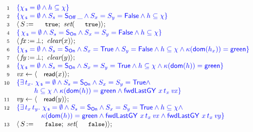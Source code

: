 \begin{figure}[t]
\[
\begin{array}[t]{r l}
  \num{1} & \specK{\{ \histS = \hempty \wedge h \subseteq \hist \}} \\
  \num{2} & \specK{\{ \histS = \hempty \wedge
                \sss = \sOff\, \_ \wedge \sx = \sy = \FF
                \wedge h \subseteq \hist\}}\\
  \num{3} & \lat\,\actwrite{\s}{\esc{true}};\ \aux{set}(\esc{true}) \rat;\\
  \num{4} & \specK{\{\, \histS = \hempty \wedge
              \sss = \sOn \wedge \sx = \sy = \FF \wedge
              h \subseteq \hist \}}\\
  \num{5} & \lat\,\actwrite{\var{\fx}}{\bot};\ \aux{clear}(x)\rat;\\
  \num{6} & \specK{\{
                 \histS = \hempty \wedge \sss= \sOn \wedge \sx = \TT
                 \wedge \sy = \FF \wedge
               h \subseteq \hist \wedge
               \C(\dom{h_{x}}) = \mathsf{green}\}}\\
  \num{7} & \lat\,\actwrite{\var{\fy}}{\bot};\ \aux{clear}(y)\rat;\\
  \num{8} & \specK{\{\histS = \hempty \wedge \sss= \sOn \wedge
             \sx = \sy = \TT \wedge
             h \subseteq \hist \wedge \C(\dom{h}) = \mathsf{green}\}}\\
  \num{9} & \var{vx} \tbnd \lat \act{read}(x) \rat;\\
  \num{10} & \specK{\{ \exists\, t_x\ldot\, \histS = \hempty \wedge
                  \sss = \sOn \wedge \sx = \sy = \TT  \wedge}\\
           & \specK{\hphantom{\{ \exists\, t_x\ldot}
                h \subseteq \hist \wedge \C(\dom{h}) = \mathsf{green} \wedge    
                \botLGY\ x\, t_x\, \var{vx} \}} \\
  \num{11} & \var{vy} \tbnd \lat \act{read}(y) \rat;\\
  \num{12} & \specK{\{ \exists\, t_x\, t_y\ldot\, \histS = \hempty \wedge
              \sss = \sOn \wedge \sx = \sy = \TT  \wedge
              h \subseteq \hist \wedge}\\
           & \specK{\hphantom{\{ \exists\, t_x \, t_y\ldot}
             \C(\dom{h}) = \mathsf{green} \wedge    
            \botLGY\ x\, t_x\, \var{vx} \wedge \botLGY\ x\, t_x\, \var{vy}\}} \\
  \num{13} &\lat\,\actwrite{\s}{\esc{false}};\ \aux{set}(\esc{false}) \rat;\\\

\end{array}\]
\end{figure}
